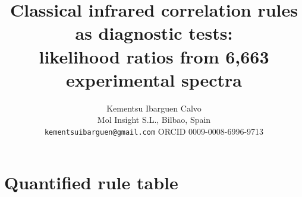 \documentclass[11pt,a4paper]{article}
\title{Classical infrared correlation rules as diagnostic tests:\\
likelihood ratios from 6,663 experimental spectra}
\author{Kementsu Ibarguen Calvo\\
\small Mol Insight S.L., Bilbao, Spain\\
\small \texttt{kementsuibarguen@gmail.com} \quad ORCID 0009-0008-6996-9713}
\date{}
\begin{document}
\maketitle












\clearpage
\appendix
\setcounter{table}{0}
\renewcommand{\thetable}{A\arabic{table}}
\section{Quantified rule table}
\label{app:table}
\small

\end{document}

